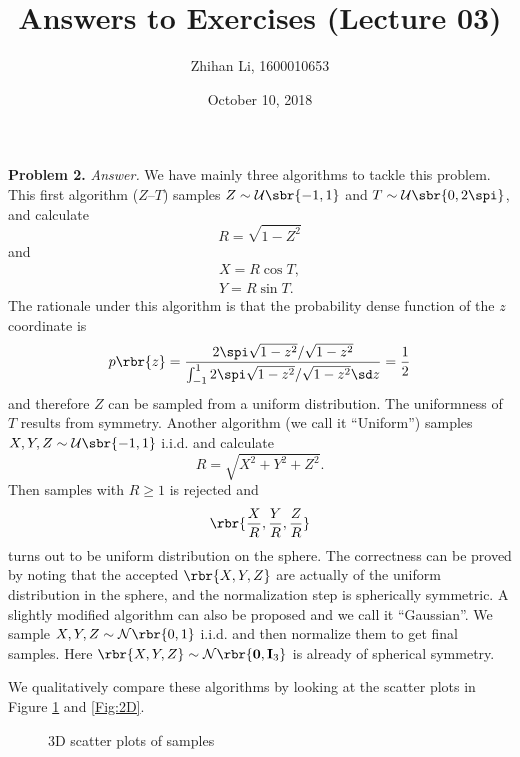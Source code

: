 \documentclass[english, nochinese]{pnote}
\title{Answers to Exercises (Lecture 03)}
\author{Zhihan Li, 1600010653}
\date{October 10, 2018}
\begin{document}
\maketitle

\textbf{Problem 2.} \textit{Answer.} We have mainly three algorithms to tackle this problem. This first algorithm ($Z$--$T$) samples $ Z \sim \mathcal{U} \sbr{ -1, 1 } $ and $ T \sim \mathcal{U} \sbr{ 0, 2 \spi } $, and calculate
\begin{equation}
R = \sqrt{ 1 - Z^2 }
\end{equation}
and
\begin{gather}
X = R \cos T, \\
Y = R \sin T.
\end{gather}
The rationale under this algorithm is that the probability dense function of the $z$ coordinate is
\begin{equation}
p \rbr{z} = \frac{ 2 \spi \sqrt{ 1 - z^2 } / \sqrt{ 1 - z^2 } }{ \int_{-1}^1 2 \spi \sqrt{ 1 - z^2 } / \sqrt{ 1 - z^2 } \sd z } = \frac{1}{2}
\end{equation}
and therefore $Z$ can be sampled from a uniform distribution. The uniformness of $T$ results from symmetry.
Another algorithm (we call it ``Uniform'') samples $ X, Y, Z \sim \mathcal{U} \sbr{ -1, 1 } $ i.i.d. and calculate
\begin{equation}
R = \sqrt{ X^2 + Y^2 + Z^2 }.
\end{equation}
Then samples with $ R \ge 1 $ is rejected and
\begin{equation}
\rbr{ \frac{X}{R}, \frac{Y}{R}, \frac{Z}{R} }
\end{equation}
turns out to be uniform distribution on the sphere. The correctness can be proved by noting that the accepted $ \rbr{ X, Y, Z } $ are actually of the uniform distribution in the sphere, and the normalization step is spherically symmetric. A slightly modified algorithm can also be proposed and we call it ``Gaussian''. We sample $ X, Y, Z \sim \mathcal{N} \rbr{ 0, 1 } $ i.i.d. and then normalize them to get final samples. Here $ \rbr{ X, Y, Z } \sim \mathcal{N} \rbr{ \mathbf{0}, \mathbf{I}_3 } $ is already of spherical symmetry.

We qualitatively compare these algorithms by looking at the scatter plots in Figure \ref{Fig:3D} and \ref{Fig:2D}.

\begin{figure}[htb]
\centering
\scalebox{0.7}{}
\caption{3D scatter plots of samples}
\label{Fig:3D}
\end{figure}
\end{document}
